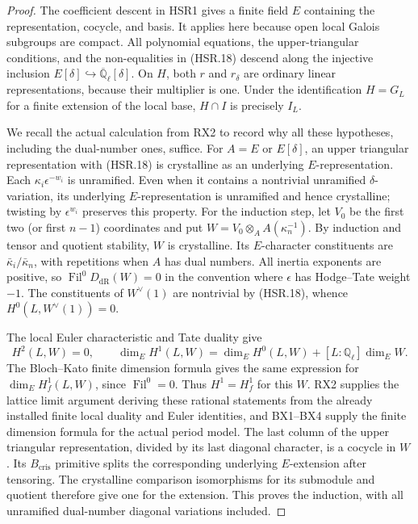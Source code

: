 \begin{proof}
The coefficient descent in HSR1 gives a finite field $E$ containing
the representation, cocycle, and basis.  It applies here because
open local Galois subgroups are compact.  All polynomial equations,
the upper-triangular conditions, and the non-equalities in
(HSR.18) descend along the injective inclusion
$E[\delta]\hookrightarrow\overline{\mathbb Q}_\ell[\delta]$.
On $H$, both $r$ and $r_\delta$ are ordinary linear
representations, because their multiplier is one.  Under the
identification $H=G_L$ for a finite extension of the local base,
$H\cap I$ is precisely $I_L$.

We recall the actual calculation from RX2 to record why all these
hypotheses, including the dual-number ones, suffice.  For
$A=E$ or $E[\delta]$, an upper triangular representation with
(HSR.18) is crystalline as an underlying $E$-representation.
Each $\kappa_i\epsilon^{-w_i}$ is unramified.  Even when it
contains a nontrivial unramified $\delta$-variation, its underlying
$E$-representation is unramified and hence crystalline; twisting
by $\epsilon^{w_i}$ preserves this property.  For the induction
step, let $V_0$ be the first two (or first $n-1$) coordinates and
put $W=V_0\otimes_A A(\kappa_n^{-1})$.  By induction and tensor
and quotient stability, $W$ is crystalline.  Its $E$-character
constituents are $\bar\kappa_i/\bar\kappa_n$, with repetitions
when $A$ has dual numbers.  All inertia exponents are positive,
so $\operatorname{Fil}^0D_{\mathrm{dR}}(W)=0$ in the convention
where $\epsilon$ has Hodge--Tate weight $-1$.
The constituents of $W^\vee(1)$ are nontrivial by (HSR.18),
whence $H^0(L,W^\vee(1))=0$.

The local Euler characteristic and Tate duality give
\[
 H^2(L,W)=0,\qquad
 \dim_E H^1(L,W)=\dim_E H^0(L,W)+[L:\mathbb Q_\ell]\dim_EW.
\]
The Bloch--Kato finite dimension formula gives the same expression
for $\dim_EH^1_f(L,W)$, since $\operatorname{Fil}^0=0$.
Thus $H^1=H^1_f$ for this $W$.  RX2 supplies the lattice limit
argument deriving these rational statements from the already
installed finite local duality and Euler identities, and BX1--BX4
supply the finite dimension formula for the actual period model.
The last column of the upper triangular representation, divided
by its last diagonal character, is a cocycle in $W$.  Its
$B_{\mathrm{cris}}$ primitive splits the corresponding underlying
$E$-extension after tensoring.  The crystalline comparison
isomorphisms for its submodule and quotient therefore give one
for the extension.  This proves the induction, with all
unramified dual-number diagonal variations included.


\end{proof}
